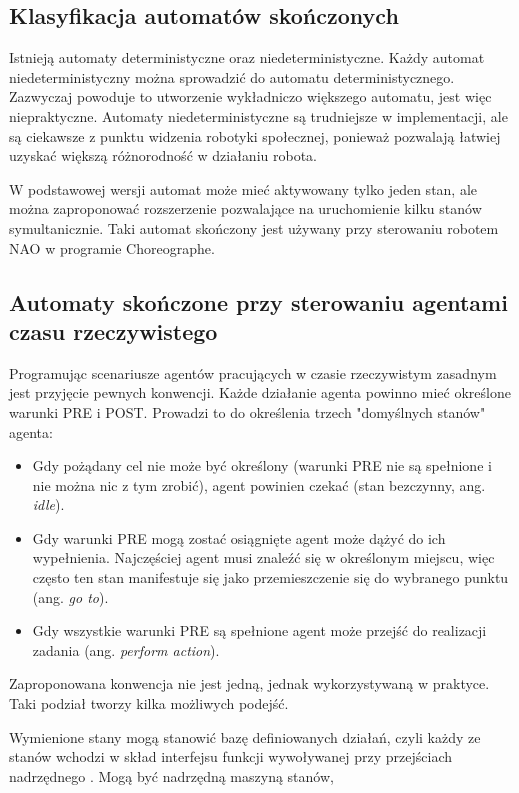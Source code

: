 \subsection{Klasyfikacja automatów skończonych}

Istnieją automaty deterministyczne oraz niedeterministyczne. Każdy automat niedeterministyczny można sprowadzić do automatu deterministycznego. Zazwyczaj powoduje to utworzenie wykładniczo większego automatu, jest więc niepraktyczne. Automaty niedeterministyczne są trudniejsze w implementacji, ale są ciekawsze z punktu widzenia robotyki społecznej, ponieważ pozwalają łatwiej uzyskać większą różnorodność w działaniu robota.

W podstawowej wersji automat może mieć aktywowany tylko jeden stan, ale można zaproponować rozszerzenie pozwalające na uruchomienie kilku stanów symultanicznie. Taki automat skończony jest używany przy sterowaniu robotem NAO w programie Choreographe.

\subsection{Automaty skończone przy sterowaniu agentami czasu rzeczywistego}

Programując scenariusze agentów pracujących w czasie rzeczywistym zasadnym jest przyjęcie pewnych konwencji. Każde działanie agenta powinno mieć określone warunki PRE i POST. Prowadzi to do określenia trzech "domyślnych stanów" agenta: 
\begin{itemize}
\setlength\itemsep{-0.4em}
    \item Gdy pożądany cel nie może być określony (warunki PRE nie są spełnione i nie można nic z tym zrobić), agent powinien czekać (stan bezczynny, ang. \textit{idle}). 
    \item Gdy warunki PRE mogą zostać osiągnięte agent może dążyć do ich wypełnienia. Najczęściej agent musi znaleźć się w określonym miejscu, więc często ten stan manifestuje się jako przemieszczenie się do wybranego punktu (ang. \textit{go to}). 
    \item Gdy wszystkie warunki PRE są spełnione agent może przejść do realizacji zadania (ang. \textit{perform action}). 
\end{itemize}

Zaproponowana konwencja nie jest jedną, jednak wykorzystywaną w praktyce. Taki podział tworzy kilka możliwych podejść. 

Wymienione stany mogą stanowić bazę definiowanych działań, czyli każdy ze stanów wchodzi w skład interfejsu funkcji wywoływanej przy przejściach nadrzędnego . Mogą być nadrzędną maszyną stanów, 

